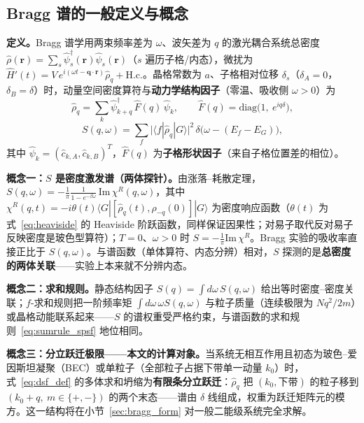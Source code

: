 \documentclass[onecolumn,aps,prl,superscriptaddress,longbibliography]{revtex4-2}
\begin{document}
\subsection{Bragg 谱的一般定义与概念}\label{sec:bragg_def}

\textbf{定义。}Bragg 谱学用两束频率差为 $\omega$、波矢差为 $q$ 的激光耦合系统总密度 $\hat{\rho}(\mathbf{r}) = \sum_s \hat{\psi}^\dagger_s(\mathbf{r})\hat{\psi}_s(\mathbf{r})$（$s$ 遍历子格/内态），微扰为 $\hat{H}'(t) = V\,e^{i(\omega t - \mathbf{q}\cdot\mathbf{r})}\hat{\rho}_q + \mathrm{H.c.}$。晶格常数为 $a$、子格相对位移 $\delta_s$（$\delta_A = 0$，$\delta_B = \delta$）时，动量空间密度算符与\textbf{动力学结构因子}（零温、吸收侧 $\omega > 0$）为
\begin{equation}\label{eq:rhoq_def}
\hat{\rho}_q = \sum_k \hat{\psi}^\dagger_{k+q}\,\hat{F}(q)\,\hat{\psi}_k,\qquad
\hat{F}(q) = \mathrm{diag}\big(1,\ e^{iq\delta}\big),
\end{equation}
\begin{equation}\label{eq:dsf_def}
S(q,\omega) = \sum_f \big|\langle f|\hat{\rho}_q|G\rangle\big|^2\,\delta\big(\omega - (E_f - E_G)\big),
\end{equation}
其中 $\hat{\psi}_k = (\hat{c}_{k,A},\hat{c}_{k,B})^T$，$\hat F(q)$ 为\textbf{子格形状因子}（来自子格位置差的相位）。

\textbf{概念一：$S$ 是密度激发谱（两体探针）。}由涨落--耗散定理，$S(q,\omega) = -\frac{1}{\pi}\frac{1}{1-e^{-\beta\omega}}\,\mathrm{Im}\,\chi^R(q,\omega)$，其中 $\chi^R(q,t) = -i\theta(t)\langle G|[\hat{\rho}_q(t),\hat{\rho}_{-q}(0)]|G\rangle$ 为密度响应函数（$\theta(t)$ 为式~\eqref{eq:heaviside} 的 Heaviside 阶跃函数，同样保证因果性；对易子取代反对易子反映密度是玻色型算符）；$T = 0$、$\omega > 0$ 时 $S = -\frac{1}{\pi}\mathrm{Im}\,\chi^R$。Bragg 实验的吸收率直接正比于 $S(q,\omega)$。与谱函数（单体算符、内态分辨）相对，$S$ 探测的是\textbf{总密度的两体关联}——实验上本来就不分辨内态。

\textbf{概念二：求和规则。}静态结构因子 $S(q) = \int d\omega\,S(q,\omega)$ 给出等时密度--密度关联；$f$-求和规则把一阶频率矩 $\int d\omega\,\omega S(q,\omega)$ 与粒子质量（连续极限为 $Nq^2/2m$）或晶格动能联系起来——$S$ 的谱权重受严格约束，与谱函数的求和规则~\eqref{eq:sumrule_spsf} 地位相同。

\textbf{概念三：分立跃迁极限——本文的计算对象。}当系统无相互作用且初态为玻色--爱因斯坦凝聚（BEC）或单粒子（全部粒子占据下带单一动量 $k_0$）时，式~\eqref{eq:dsf_def} 的多体求和坍缩为\textbf{有限条分立跃迁}：$\hat{\rho}_q$ 把 $(k_0,\text{下带})$ 的粒子移到 $(k_0+q,\ m\in\{+,-\})$ 的两个末态——谱由 $\delta$ 线组成，权重为跃迁矩阵元的模方。这一结构将在小节~\ref{sec:bragg_form} 对一般二能级系统完全求解。
\end{document}
